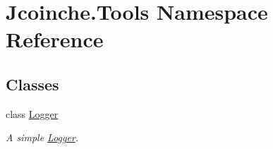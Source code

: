 \hypertarget{namespace_jcoinche_1_1_tools}{}\section{Jcoinche.\+Tools Namespace Reference}
\label{namespace_jcoinche_1_1_tools}
\subsection*{Classes}
\begin{DoxyCompactItemize}
\item 
class \hyperlink{class_jcoinche_1_1_tools_1_1_logger}{Logger}
\begin{DoxyCompactList}\small\item\em A simple \hyperlink{class_jcoinche_1_1_tools_1_1_logger}{Logger}. \end{DoxyCompactList}\end{DoxyCompactItemize}
